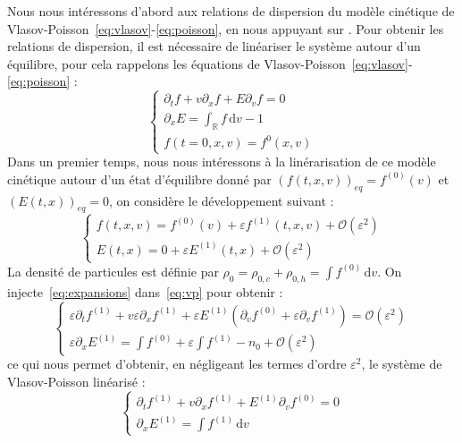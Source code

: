 Nous nous intéressons d'abord aux relations de dispersion du modèle cinétique de Vlasov-Poisson~\eqref{eq:vlasov}-\eqref{eq:poisson}, en nous appuyant sur \cite{Sonnendrucker:2015}. Pour obtenir les relations de dispersion, il est nécessaire de linéariser le système autour d'un équilibre, pour cela rappelons les équations de Vlasov-Poisson~\eqref{eq:vlasov}-\eqref{eq:poisson} :
\begin{equation}
  \begin{cases}
    \partial_t f + v\partial_xf + E\partial_vf = 0 \\
    \partial_x E = \int_\mathbb{R} f\,\mathrm{d}v - 1 \\
    f(t=0, x, v)=f^0(x,v)
  \end{cases}
  \label{eq:vp}
\end{equation}
Dans un premier temps, nous nous intéressons à la linérarisation de ce modèle cinétique autour d'un état d'équilibre donné par $\left(f(t,x,v)\right)_{eq} = f^{(0)}(v)$ et $\left(E(t,x)\right)_{eq} = 0$, on considère le développement suivant :
\begin{equation}
  \begin{cases}
    f(t,x,v) = f^{(0)}(v) + \varepsilon f^{(1)}(t,x,v) + \mathcal{O}(\varepsilon^2) \\
    E(t,x) = 0 + \varepsilon E^{(1)}(t,x) + \mathcal{O}(\varepsilon^2)
  \end{cases}
  \label{eq:expansions}
\end{equation}
La densité de particules est définie par $\rho_0 = \rho_{0,c}+\rho_{0,h} = \int f^{(0)}\,\mathrm{d}v$. On injecte~\eqref{eq:expansions} dans~\eqref{eq:vp} pour obtenir :
$$
  \begin{cases}
    \varepsilon\partial_t f^{(1)} + v\varepsilon\partial_x f^{(1)} + \varepsilon E^{(1)}\left(\partial_v f^{(0)}+\varepsilon\partial_v f^{(1)}\right)=\mathcal{O}(\varepsilon^2) \\
    \varepsilon\partial_x E^{(1)} = \int f^{(0)} + \varepsilon\int f^{(1)} - n_0 + \mathcal{O}(\varepsilon^2)
  \end{cases}
$$
ce qui nous permet d'obtenir, en négligeant les termes d'ordre $\varepsilon^2$, le système de Vlasov-Poisson linéarisé :
\begin{equation}
  \begin{cases}
    \partial_t f^{(1)} + v\partial_x f^{(1)} + E^{(1)}\partial_v f^{(0)} = 0 \\
    \partial_x E^{(1)} = \int f^{(1)}\,\mathrm{d}v
  \end{cases}
  \label{eq:systVPlin}
\end{equation}

